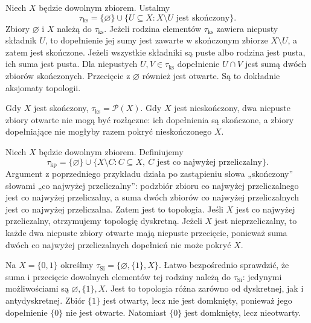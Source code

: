 \begin{przyklad}
\label{ex:topog-kofinita}
Niech $X$ będzie dowolnym zbiorem. Ustalmy
\[
\tau_{\mathrm{ks}}=\{\varnothing\}\cup
\{U\subseteq X:X\setminus U\text{ jest skończony}\}.
\]
Zbiory $\varnothing$ i $X$ należą do $\tau_{\mathrm{ks}}$.
Jeżeli rodzina elementów $\tau_{\mathrm{ks}}$ zawiera
niepusty składnik $U$, to dopełnienie jej sumy jest zawarte
w skończonym zbiorze $X\setminus U$, a zatem jest skończone.
Jeżeli wszystkie składniki są puste albo rodzina jest pusta,
ich suma jest pusta.
Dla niepustych $U,V\in\tau_{\mathrm{ks}}$ dopełnienie
$U\cap V$ jest sumą dwóch zbiorów skończonych.
Przecięcie z $\varnothing$ również jest otwarte.
Są to dokładnie aksjomaty topologii.

Gdy $X$ jest skończony, $\tau_{\mathrm{ks}}=\mathcal P(X)$.
Gdy $X$ jest nieskończony, dwa niepuste zbiory otwarte
nie mogą być rozłączne: ich dopełnienia są skończone,
a zbiory dopełniające nie mogłyby razem pokryć
nieskończonego $X$.
\end{przyklad}

\begin{przyklad}
\label{ex:topog-koprzeliczalna}
Niech $X$ będzie dowolnym zbiorem. Definiujemy
\[
\tau_{\mathrm{kp}}=\{\varnothing\}\cup
\{X\setminus C:C\subseteq X,\ C\text{ jest co najwyżej przeliczalny}\}.
\]
Argument z poprzedniego przykładu działa po zastąpieniu
słowa „skończony” słowami „co najwyżej przeliczalny”:
podzbiór zbioru co najwyżej przeliczalnego jest
co najwyżej przeliczalny, a suma dwóch zbiorów
co najwyżej przeliczalnych jest co najwyżej przeliczalna.
Zatem jest to topologia. Jeśli $X$ jest co najwyżej
przeliczalny, otrzymujemy topologię dyskretną.
Jeżeli $X$ jest nieprzeliczalny, to każde dwa niepuste
zbiory otwarte mają niepuste przecięcie, ponieważ suma
dwóch co najwyżej przeliczalnych dopełnień nie może pokryć $X$.
\end{przyklad}

\begin{przyklad}
\label{ex:topog-sierpinski}
Na $X=\{0,1\}$ określmy
$\tau_{\mathrm{Si}}=\{\varnothing,\{1\},X\}$. Łatwo bezpośrednio
sprawdzić, że suma i przecięcie dowolnych elementów
tej rodziny należą do $\tau_{\mathrm{Si}}$: jedynymi możliwościami
są $\varnothing,\{1\},X$. Jest to topologia różna
zarówno od dyskretnej, jak i antydyskretnej.
Zbiór $\{1\}$ jest otwarty, lecz nie jest domknięty,
ponieważ jego dopełnienie $\{0\}$ nie jest otwarte.
Natomiast $\{0\}$ jest domknięty, lecz nieotwarty.
\end{przyklad}

